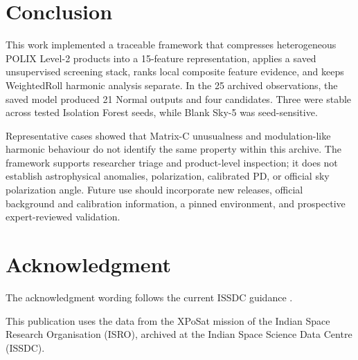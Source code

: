 \documentclass[conference]{IEEEtran}
\begin{document}
\section{Conclusion}
This work implemented a traceable framework that compresses heterogeneous POLIX Level-2 products into a 15-feature representation, applies a saved unsupervised screening stack, ranks local composite feature evidence, and keeps WeightedRoll harmonic analysis separate. In the 25 archived observations, the saved model produced 21 Normal outputs and four candidates. Three were stable across tested Isolation Forest seeds, while Blank Sky-5 was seed-sensitive.

Representative cases showed that Matrix-C unusualness and modulation-like harmonic behaviour do not identify the same property within this archive. The framework supports researcher triage and product-level inspection; it does not establish astrophysical anomalies, polarization, calibrated PD, or official sky polarization angle. Future use should incorporate new releases, official background and calibration information, a pinned environment, and prospective expert-reviewed validation.

\section*{Acknowledgment}
The acknowledgment wording follows the current ISSDC guidance \cite{issdc_xposat_ack}.

This publication uses the data from the XPoSat mission of the Indian Space Research Organisation (ISRO), archived at the Indian Space Science Data Centre (ISSDC).



\end{document}
